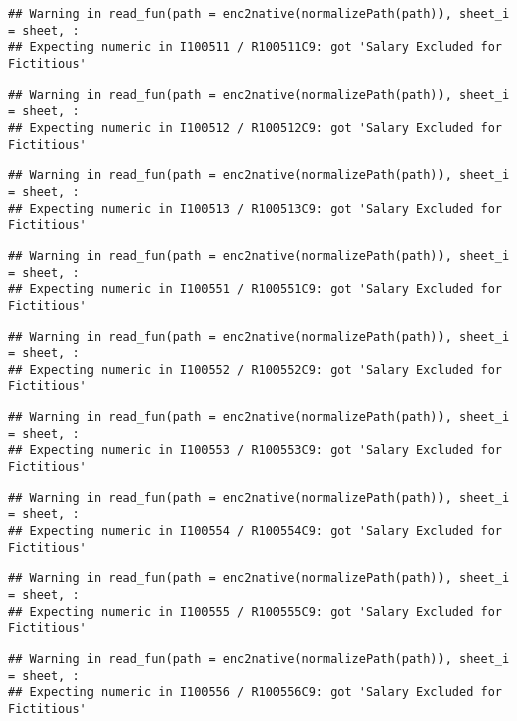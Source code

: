 \documentclass[
]{article}
\begin{document}
\begin{verbatim}
## Warning in read_fun(path = enc2native(normalizePath(path)), sheet_i = sheet, :
## Expecting numeric in I100511 / R100511C9: got 'Salary Excluded for Fictitious'
\end{verbatim}

\begin{verbatim}
## Warning in read_fun(path = enc2native(normalizePath(path)), sheet_i = sheet, :
## Expecting numeric in I100512 / R100512C9: got 'Salary Excluded for Fictitious'
\end{verbatim}

\begin{verbatim}
## Warning in read_fun(path = enc2native(normalizePath(path)), sheet_i = sheet, :
## Expecting numeric in I100513 / R100513C9: got 'Salary Excluded for Fictitious'
\end{verbatim}

\begin{verbatim}
## Warning in read_fun(path = enc2native(normalizePath(path)), sheet_i = sheet, :
## Expecting numeric in I100551 / R100551C9: got 'Salary Excluded for Fictitious'
\end{verbatim}

\begin{verbatim}
## Warning in read_fun(path = enc2native(normalizePath(path)), sheet_i = sheet, :
## Expecting numeric in I100552 / R100552C9: got 'Salary Excluded for Fictitious'
\end{verbatim}

\begin{verbatim}
## Warning in read_fun(path = enc2native(normalizePath(path)), sheet_i = sheet, :
## Expecting numeric in I100553 / R100553C9: got 'Salary Excluded for Fictitious'
\end{verbatim}

\begin{verbatim}
## Warning in read_fun(path = enc2native(normalizePath(path)), sheet_i = sheet, :
## Expecting numeric in I100554 / R100554C9: got 'Salary Excluded for Fictitious'
\end{verbatim}

\begin{verbatim}
## Warning in read_fun(path = enc2native(normalizePath(path)), sheet_i = sheet, :
## Expecting numeric in I100555 / R100555C9: got 'Salary Excluded for Fictitious'
\end{verbatim}

\begin{verbatim}
## Warning in read_fun(path = enc2native(normalizePath(path)), sheet_i = sheet, :
## Expecting numeric in I100556 / R100556C9: got 'Salary Excluded for Fictitious'
\end{verbatim}
\end{document}
